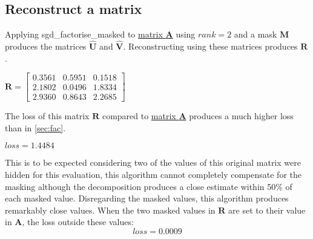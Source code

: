 \documentclass[sigconf]{acmart}
\begin{document}
\subsection{Reconstruct a matrix}
Applying sgd\_factorise\_masked to \hyperlink{mat:A}{matrix \textbf{A}} using $rank=2$ and a mask $\mathbf{M}$ produces the matrices $\mathbf{\hat{U}}$ and $\mathbf{\hat{V}}$.
Reconstructing using these matrices produces $\mathbf{R}$.
\begin{center}
    \begin{math}
        \mathbf{R} = \begin{bmatrix}
        0.3561 & 0.5951 & 0.1518 \\
        2.1802 & 0.0496 & 1.8334 \\
        2.9360 & 0.8643 & 2.2685 
        \end{bmatrix} 
    \end{math}
\end{center} 
The loss of this matrix $\mathbf{R}$ compared to \hyperlink{mat:A}{matrix \textbf{A}} produces a much higher loss than in \ref{sec:fac}.
\begin{center}
    \begin{math}
        loss = 1.4484
    \end{math}
\end{center}
This is to be expected considering two of the values of this original matrix were hidden for this evaluation, this algorithm cannot completely compensate for the masking although the decomposition produces a close estimate within 50\% of each masked value.
Disregarding the masked values, this algorithm produces remarkably close values. When the two masked values in $\mathbf{R}$ are set to their value in $\mathbf{A}$, the loss outside these values: $$loss = 0.0009$$
\end{document}
